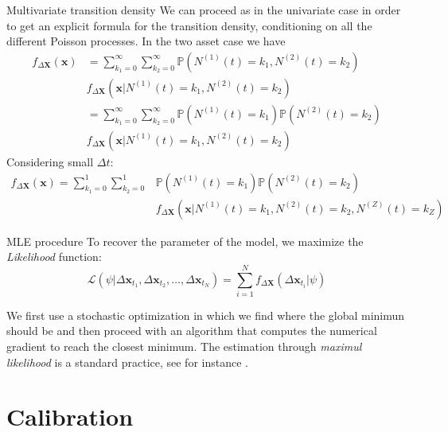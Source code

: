\documentclass{beamer}
\begin{document}
\begin{frame}{Multivariate transition density}
We can proceed as in the univariate case in order to get an explicit formula for the transition density, conditioning on all the different Poisson processes. In the two asset case we have
\begin{equation*}
\begin{aligned}
    f_{\Delta\mathbf{X}}(\mathbf{x}) &= \sum_{k_1=0}^{\infty}\sum_{k_2=0}^{\infty} \mathbb{P}(N^{(1)}(t) = k_1, N^{(2)}(t)=k_2) \\
    &f_{\Delta\mathbf{X}}(\mathbf{x} | N^{(1)}(t) = k_1, N^{(2)}(t)=k_2)\\
    &= \sum_{k_1=0}^{\infty}\sum_{k_2=0}^{\infty}\mathbb{P}(N^{(1)}(t) = k_1) \mathbb{P}(N^{(2)}(t)=k_2)\\
    &f_{\Delta\mathbf{X}}(\mathbf{x} | N^{(1)}(t) = k_1, N^{(2)}(t)=k_2)
\end{aligned}
\end{equation*}
Considering small $\Delta t$:
\begin{equation*}
\begin{aligned}
        f_{\Delta\mathbf{X}}(\mathbf{x}) = \sum_{k_1=0}^{1}\sum_{k_2=0}^{1} &\mathbb{P}(N^{(1)}(t) = k_1) \mathbb{P}(N^{(2)}(t)=k_2)\\ &f_{\Delta\mathbf{X}}(\mathbf{x}| N^{(1)}(t) = k_1, N^{(2)}(t)=k_2, N^{(Z)}(t)=k_Z )
\end{aligned}
\end{equation*}

\end{frame}

\begin{frame}{MLE procedure}
To recover the parameter of the model, we maximize the \textit{Likelihood} function:
    \begin{equation}
    \mathcal{L}(\psi | \Delta \mathbf{x}_{t_1},\Delta \mathbf{x}_{t_2},\dots,\Delta \mathbf{x}_{t_N}) = \sum_{i=1}^{N} f_{\Delta \mathbf{X}}(\Delta\mathbf{x}_{t_i} | \psi)
\end{equation}

We first use a stochastic optimization in which we find where the global minimun should be and then proceed with an algorithm that computes the numerical gradient to reach the closest minimum.
The estimation through \textit{maximul likelihood} is a standard practice, see for instance \cite{HONORE1998}.

\end{frame}


\section{Calibration}
\end{document}
